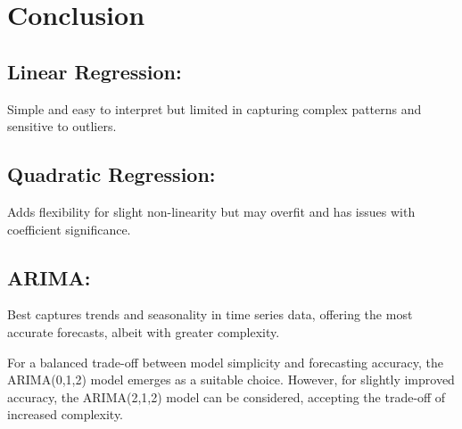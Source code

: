 \documentclass[
]{book}
\begin{document}
\chapter{Conclusion}\label{conclusion}

\section{Linear Regression:}\label{linear-regression-1}

Simple and easy to interpret but limited in capturing complex patterns and sensitive to outliers.

\section{Quadratic Regression:}\label{quadratic-regression-1}

Adds flexibility for slight non-linearity but may overfit and has issues with coefficient significance.

\section{ARIMA:}\label{arima}

Best captures trends and seasonality in time series data, offering the most accurate forecasts, albeit with greater complexity.

For a balanced trade-off between model simplicity and forecasting accuracy, the ARIMA(0,1,2) model emerges as a suitable choice. However, for slightly improved accuracy, the ARIMA(2,1,2) model can be considered, accepting the trade-off of increased complexity.

  
\end{document}
